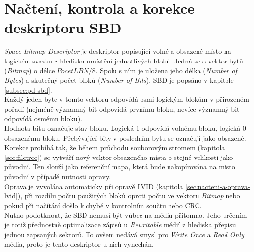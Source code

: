 \section{Načtení, kontrola a korekce deskriptoru SBD}
\label{sec:nacteni-a-oprava-sbd}
\textit{Space Bitmap Descriptor} je deskriptor popisující volné a obsazené místo na logickém svazku z hlediska umístění jednotlivých bloků. Jedná se o vektor bytů (\textit{Bitmap}) o délce $PocetLBN / 8$. Spolu s ním je uložena jeho délka (\textit{Number of Bytes}) a skutečný počet bloků (\textit{Number of Bits}). SBD je popsáno v kapitole \ref{subsec:pd-sbd}.\\ 
Každý jeden byte v tomto vektoru odpovídá osmi logickým blokům v přirozeném pořadí (nejméně významný bit odpovídá prvnímu bloku, nevíce významný bit odpovídá osmému bloku).\\
Hodnota bitu označuje stav bloku. Logická 1 odpovídá volnému bloku, logická 0 obsazenému bloku. Přebývající bity v posledním bytu se označují jako obsazené.\\
Korekce probíhá tak, že během průchodu souborovým stromem (kapitola \ref{sec:filetree}) se vytváří nový vektor obsazeného místa o stejné velikosti jako původní. Ten slouží jako referenční mapa, která bude nakopírována na místo původní v případě nutnosti opravy.\\
Oprava je vyvolána automaticky při opravě LVID (kapitola \ref{sec:nacteni-a-oprava-lvid}), při rozdílu počtu použitých bloků oproti počtu ve vektoru \textit{Bitmap} nebo pokud při načítání došlo k chybě v kontrolním součtu nebo CRC.\\
Nutno podotknout, že SBD nemusí být vůbec na médiu přítomno. Jeho určením je totiž přednostně optimalizace zápisů u \textit{Rewritable} médií z hlediska přepisu jednou zapsaných sektorů. To ovšem nedává smysl pro \textit{Write Once} a \textit{Read Only} média, proto je tento deskriptor u nich vynechán.

